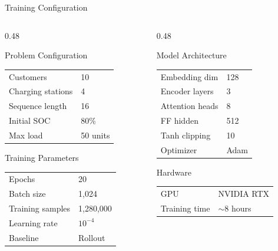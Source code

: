 \documentclass[aspectratio=169,11pt]{beamer}
\begin{document}
\begin{frame}{Training Configuration}
    \begin{columns}[T]
        \begin{column}{0.48\textwidth}
            \begin{block}{Problem Configuration}
                \begin{tabular}{ll}
                    Customers & 10 \\
                    Charging stations & 4 \\
                    Sequence length & 16 \\
                    Initial SOC & 80\% \\
                    Max load & 50 units
                \end{tabular}
            \end{block}
            
            \begin{block}{Training Parameters}
                \begin{tabular}{ll}
                    Epochs & 20 \\
                    Batch size & 1,024 \\
                    Training samples & 1,280,000 \\
                    Learning rate & $10^{-4}$ \\
                    Baseline & Rollout
                \end{tabular}
            \end{block}
        \end{column}
        \begin{column}{0.48\textwidth}
            \begin{block}{Model Architecture}
                \begin{tabular}{ll}
                    Embedding dim & 128 \\
                    Encoder layers & 3 \\
                    Attention heads & 8 \\
                    FF hidden & 512 \\
                    Tanh clipping & 10 \\
                    Optimizer & Adam
                \end{tabular}
            \end{block}
            
            \begin{block}{Hardware}
                \begin{tabular}{ll}
                    GPU & NVIDIA RTX \\
                    Training time & $\sim$8 hours
                \end{tabular}
            \end{block}
        \end{column}
    \end{columns}
\end{frame}
\end{document}
